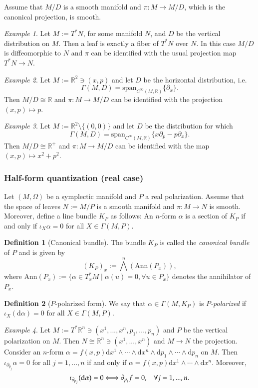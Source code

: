 \documentclass[11pt]{amsart}
\numberwithin{equation}{section}
\theoremstyle{plain}
\theoremstyle{definition}
\newtheorem{defn}{Definition}[subsection]
\theoremstyle{remark}
\newtheorem{ex}{Example}[subsection]
\newcommand{\R}{\mathbb{R}}
\newcommand{\dd}{{\mathrm{d}}}
\begin{document}
Assume that $M/D$ is a smooth manifold and $\pi\colon M\to M/D$, which is the canonical projection, is smooth. 

\begin{ex}
Let $M:=T^*N$, for some manifold $N$, and $D$ be the vertical distribution on $M$. Then a leaf is exactly a fiber of $T^*N$ over $N$. In this case $M/D$ is diffeomorphic to $N$ and $\pi$ can be identified with the usual projection map $T^*N\to N$.
\end{ex}


\begin{ex}
Let $M:=\R^2\ni(x,p)$ and let $D$ be the horizontal distribution, i.e. $$\Gamma(M,D)=\mathrm{span}_{C^\infty(M,\R)}\{\partial_x\}.$$ Then $M/D\cong \R$ and $\pi\colon M\to M/D$ can be identified with the projection $(x,p)\mapsto p$.
\end{ex}

\begin{ex}
Let $M:=\R^2\setminus\{(0,0)\}$ and let $D$ be the distribution for which $$\Gamma(M,D)=\mathrm{span}_{C^\infty(M,\R)}\{x\partial_p-p\partial_x\}.$$ Then $M/D\cong \R^+$ and $\pi\colon M\to M/D$ can be identified with the map $(x,p)\mapsto x^2+p^2$.
\end{ex}

\subsubsection{Half-form quantization (real case)}
Let $(M,\Omega)$ be a symplectic manifold and $P$ a real polarization. Assume that the space of leaves $N:=M/P$ is a smooth manifold and $\pi\colon M\to N$ is smooth. Moreover, define a line bundle $K_P$ as follows: An $n$-form $\alpha$ is a section of $K_P$ if and only if $\iota_X\alpha=0$ for all $X\in\Gamma(M,P)$. 

\begin{defn}[Canonical bundle]
The bundle $K_P$ is called the \emph{canonical bundle} of $P$ and is given by 
$$(K_P)_x:=\bigwedge^n\left(\mathrm{Ann}(P_x)\right),$$
where $\mathrm{Ann}(P_x):=\{\alpha\in T^*_xM\mid \alpha(u)=0,\forall u\in P_x\}$ denotes the annihilator of $P_x$.
\end{defn}

\begin{defn}[$P$-polarized form]
We say that $\alpha\in\Gamma(M,K_P)$ is \emph{$P$-polarized} if $\iota_X(\dd\alpha)=0$ for all $X\in\Gamma(M,P)$.
\end{defn}

\begin{ex}
Let $M:=T^*\R^n\ni (x^1,...,x^n,p_1,...,p_n)$ and $P$ be the vertical polarization on $M$. Then $N\cong \R^n\ni(x^1,...,x^n)$ and $M\to N$ the projection. Consider an $n$-form $\alpha=f(x,p)\dd x^1\land\dotsm \land\dd x^n\land \dd p_1\land\dotsm \land \dd p_n$ on $M$. Then $\iota_{\partial_{p_j}}\alpha=0$ for all $j=1,...,n$ if and only if $\alpha=f(x,p)\dd x^1\land\dotsm  \land \dd x^n$. Moreover, 
\begin{equation}
\label{moreover}
\iota_{\partial_{p_j}}(\dd\alpha)=0\Longleftrightarrow\partial_{p_j}f=0, \hspace{0.3cm}\forall j=1,...,n.
\end{equation}
\end{ex}
\end{document}
